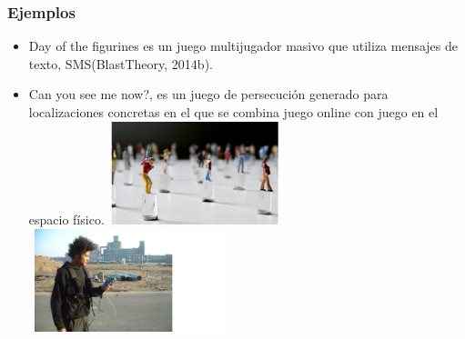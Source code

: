 \documentclass[11pt]{beamer}
\begin{document}
\begin{frame}
\frametitle{Ejemplos}
\begin{itemize}
\item Day of the figurines es un juego multijugador masivo que utiliza mensajes de texto, SMS(BlastTheory, 2014b). 
\item Can you see me now?, es un juego de persecución generado para localizaciones concretas en el que se combina juego online con juego en el espacio físico. 
\center \includegraphics[width=5cm,height=3cm]{img/figurita.png}\includegraphics[width=6cm,height=3cm]{img/guy.png}\center
\end{itemize}
\end{frame}
\end{document}
